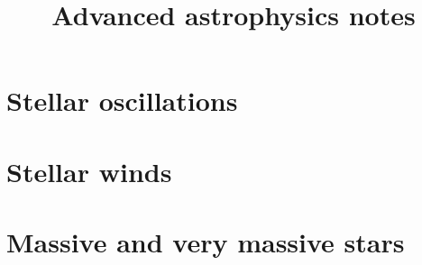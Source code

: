 \documentclass[12pt]{report}
\title{Advanced astrophysics notes}
\begin{document}
\maketitle
\tableofcontents

\chapter{Stellar oscillations}













\chapter{Stellar winds}



















\chapter{Massive and very massive stars}







\end{document}

